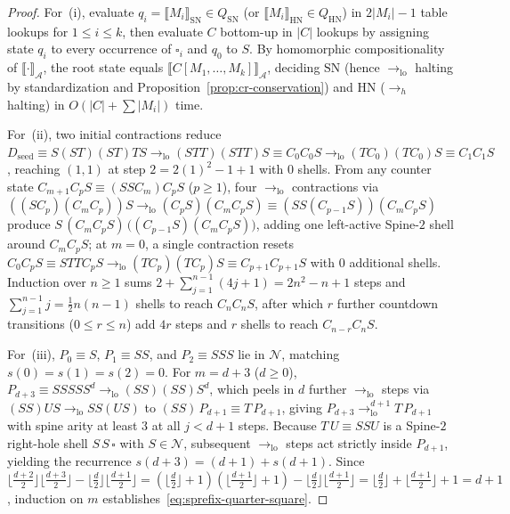 \documentclass[11pt,reqno]{amsart}
\numberwithin{equation}{section}
\theoremstyle{plain}
\theoremstyle{definition}
\theoremstyle{remark}
\newcommand{\SN}{\mathrm{SN}}
\newcommand{\HN}{\mathrm{HN}}
\newcommand{\sem}[1]{\llbracket #1 \rrbracket}
\begin{document}
\begin{proof}
For~(i), evaluate $q_i = \sem{M_i}_{\SN} \in Q_{\SN}$ (or $\sem{M_i}_{\HN} \in Q_{\HN}$) in $2|M_i| - 1$ table lookups for $1 \le i \le k$, then evaluate $C$ bottom-up in $|C|$ lookups by assigning state $q_i$ to every occurrence of $\square_i$ and $q_0$ to $S$. By homomorphic compositionality of $\sem{\cdot}_{\mathcal{A}}$, the root state equals $\sem{C[M_1, \dots, M_k]}_{\mathcal{A}}$, deciding $\SN$ (hence $\to_{\mathrm{lo}}$ halting by standardization and Proposition~\ref{prop:cr-conservation}) and $\HN$ ($\to_h$ halting) in $O(|C| + \sum |M_i|)$ time.

For~(ii), two initial contractions reduce $D_{\mathrm{seed}} \equiv S(S T)(S T)T S \to_{\mathrm{lo}} (S T T)(S T T) S \equiv C_0 C_0 S \to_{\mathrm{lo}} (T C_0)(T C_0) S \equiv C_1 C_1 S$, reaching $(1, 1)$ at step $2 = 2(1)^2 - 1 + 1$ with $0$ shells. From any counter state $C_{m+1} C_p S \equiv (S S C_m) C_p S$ ($p \ge 1$), four $\to_{\mathrm{lo}}$ contractions via $((S C_p)(C_m C_p)) S \to_{\mathrm{lo}} (C_p S)(C_m C_p S) \equiv (S S (C_{p-1} S))(C_m C_p S)$ produce $S\,(C_m C_p S)\,\bigl((C_{p-1} S)(C_m C_p S)\bigr)$, adding one left-active Spine-$2$ shell around $C_m C_p S$; at $m = 0$, a single contraction resets $C_0 C_p S \equiv S T T C_p S \to_{\mathrm{lo}} (T C_p)(T C_p) S \equiv C_{p+1} C_{p+1} S$ with $0$ additional shells. Induction over $n \ge 1$ sums $2 + \sum_{j=1}^{n-1} (4j + 1) = 2n^2 - n + 1$ steps and $\sum_{j=1}^{n-1} j = \frac{1}{2}n(n-1)$ shells to reach $C_n C_n S$, after which $r$ further countdown transitions ($0 \le r \le n$) add $4r$ steps and $r$ shells to reach $C_{n-r} C_n S$.

For~(iii), $P_0 \equiv S$, $P_1 \equiv S S$, and $P_2 \equiv S S S$ lie in $\mathcal{N}$, matching $s(0) = s(1) = s(2) = 0$. For $m = d + 3$ ($d \ge 0$), $P_{d+3} \equiv S S S S S^d \to_{\mathrm{lo}} (S S)(S S) S^d$, which peels in $d$ further $\to_{\mathrm{lo}}$ steps via $(S S) U S \to_{\mathrm{lo}} S S (U S)$ to $(S S)\,P_{d+1} \equiv T\,P_{d+1}$, giving $P_{d+3} \to_{\mathrm{lo}}^{d+1} T\,P_{d+1}$ with spine arity at least $3$ at all $j < d + 1$ steps. Because $T\,U \equiv S S U$ is a Spine-$2$ right-hole shell $S\,S\,\square$ with $S \in \mathcal{N}$, subsequent $\to_{\mathrm{lo}}$ steps act strictly inside $P_{d+1}$, yielding the recurrence $s(d + 3) = (d + 1) + s(d + 1)$. Since $\lfloor \frac{d+2}{2} \rfloor \lfloor \frac{d+3}{2} \rfloor - \lfloor \frac{d}{2} \rfloor \lfloor \frac{d+1}{2} \rfloor = (\lfloor \frac{d}{2} \rfloor + 1)(\lfloor \frac{d+1}{2} \rfloor + 1) - \lfloor \frac{d}{2} \rfloor \lfloor \frac{d+1}{2} \rfloor = \lfloor \frac{d}{2} \rfloor + \lfloor \frac{d+1}{2} \rfloor + 1 = d + 1$, induction on $m$ establishes~\eqref{eq:sprefix-quarter-square}.
\end{proof}
\end{document}
